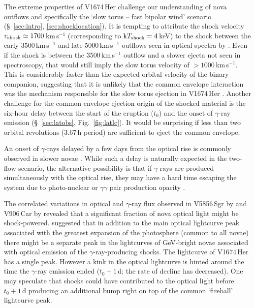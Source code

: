\documentclass[a4paper,fleqn,usenatbib]{mnras}
\newcommand{\nova}{V1674\,Her}
\begin{document}
The extreme properties of \nova{} challenge our understanding 
of nova outflows and specifically the `slow torus -- fast bipolar wind'
scenario (\S~\ref{sec:intro}, \ref{sec:shocklocation}).
%
It is tempting to attribute the shock velocity 
$v_{\rm shock} \simeq 1700$\,km\,s$^{-1}$ (corresponding to ${\rm k} T_{\rm shock} = 4$\,keV)
to the shock between the early 3500\,km\,s$^{-1}$ and late 5000\,km\,s$^{-1}$ outflows seen 
in optical spectra by \cite{2021ATel14710....1A}. Even if the shock is
between the 3500\,km\,s$^{-1}$ outflow and a slower ejecta not seen in spectroscopy, 
that would still imply the slow torus velocity of $>1000$\,km\,s$^{-1}$. 
This is considerably faster than the expected orbital velocity of the binary companion, 
suggesting that it is unlikely that the common envelope interaction was the mechanism
responsible for the slow torus ejection in \nova{} \citep{2021ARA&A..59..391C}.
%
Another challenge for the common envelope ejection origin of the shocked material is
the six-hour delay between the start of the eruption ($t_0$) and the onset 
of $\gamma$-ray emission (\S~\ref{sec:latobs}, Fig.~\ref{fig:latlc}).
It would be surprising if less than two orbital revolutions (3.67\,h period) are sufficient to eject the common envelope. 

An onset of $\gamma$-rays delayed by a few days from the optical rise is commonly observed 
in slower novae \citep[][]{2014Sci...345..554A,2016ApJ...826..142C,2017MNRAS.469.4341M}. 
While such a delay is naturally expected in the two-flow scenario, the
alternative possibility is that if $\gamma$-rays are produced simultaneously
with the optical rise, they may have a hard time escaping the system due to 
photo-nuclear or $\gamma\gamma$ pair production opacity
\citep[][]{2016MNRAS.457.1786M,2018MNRAS.475.1521M,2020ApJ...904....4F,2022Sci...376...77A}.

The correlated variations in optical and $\gamma$-ray flux observed in
V5856\,Sgr by \cite{2017NatAs...1..697L} and V906\,Car by \cite{2020NatAs...4..776A}
revealed that a significant fraction of nova optical light might be
shock-powered. \cite{2017MNRAS.469.4341M} suggested that in addition to the
main optical lightcurve peak associated with the greatest expansion of the photosphere 
(common to all novae) there might be a separate peak in the lightcurves of GeV-bright novae
associated with optical emission of the $\gamma$-ray-producing shocks.
The lightcurve of \nova{} has a single peak. However a kink in the optical 
lightcurve is hinted around the time the $\gamma$-ray emission ended 
($t_0 + 1$\,d; the rate of decline has decreased). One may speculate 
that shocks could have contributed to the optical light before $t_0 + 1$\,d
producing an additional bump right on top of the common `fireball' lightcurve peak. 
\end{document}
